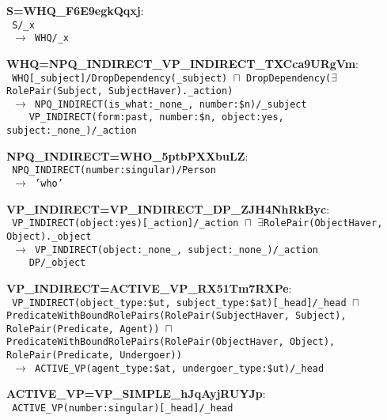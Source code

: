 \documentclass[letterpaper]{article}
\begin{document}
\small{
\begin{flushleft}
\begin{flushleft}
\noindent \textbf{S=WHQ\_F6E9egkQqxj}: \\
\texttt{
S/\_x \\
~$\rightarrow$ WHQ/\_x
}
\end{flushleft}
\begin{flushleft}
\noindent \textbf{WHQ=NPQ\_INDIRECT\_VP\_INDIRECT\_TXCca9URgVm}: \\
\texttt{
WHQ[\_subject]/DropDependency(\_subject) $\sqcap$ DropDependency($\exists$RolePair(Subject, SubjectHaver).\_action) \\
~$\rightarrow$ NPQ\_INDIRECT(is\_what:\_none\_, number:\$n)/\_subject \\
~~~~VP\_INDIRECT(form:past, number:\$n, object:yes, subject:\_none\_)/\_action
}
\end{flushleft}
\begin{flushleft}
\noindent \textbf{NPQ\_INDIRECT=WHO\_5ptbPXXbuLZ}: \\
\texttt{
NPQ\_INDIRECT(number:singular)/Person \\
~$\rightarrow$ 'who'
}
\end{flushleft}
\begin{flushleft}
\noindent \textbf{VP\_INDIRECT=VP\_INDIRECT\_DP\_ZJH4NhRkByc}: \\
\texttt{
VP\_INDIRECT(object:yes)[\_action]/\_action $\sqcap$ $\exists$RolePair(ObjectHaver, Object).\_object \\
~$\rightarrow$ VP\_INDIRECT(object:\_none\_, subject:\_none\_)/\_action \\
~~~~DP/\_object
}
\end{flushleft}
\begin{flushleft}
\noindent \textbf{VP\_INDIRECT=ACTIVE\_VP\_RX51Tm7RXPe}: \\
\texttt{
VP\_INDIRECT(object\_type:\$ut, subject\_type:\$at)[\_head]/\_head $\sqcap$ PredicateWithBoundRolePairs(RolePair(SubjectHaver, Subject), RolePair(Predicate, Agent)) $\sqcap$ PredicateWithBoundRolePairs(RolePair(ObjectHaver, Object), RolePair(Predicate, Undergoer)) \\
~$\rightarrow$ ACTIVE\_VP(agent\_type:\$at, undergoer\_type:\$ut)/\_head
}
\end{flushleft}
\begin{flushleft}
\noindent \textbf{ACTIVE\_VP=VP\_SIMPLE\_hJqAyjRUYJp}: \\
\texttt{
ACTIVE\_VP(number:singular)[\_head]/\_head \\
}
\end{flushleft}
\end{flushleft}}
\end{document}
